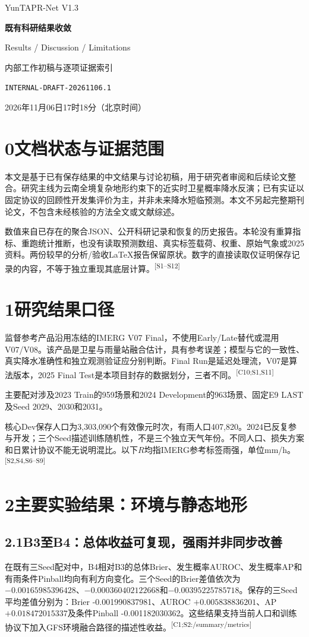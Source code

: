 \documentclass[UTF8,10.5pt,a4paper,fontset=none]{ctexart}
\newcommand{\evi}[1]{\textsuperscript{\textcolor{muted}{[#1]}}}
\newcommand{\nextpart}[1]{\clearpage\section*{#1}}
\begin{document}
\thispagestyle{empty}
\begin{center}
{\Large YunTAPR-Net V1.3}\par\vspace{5mm}
{\LARGE\bfseries 既有科研结果收敛}\par\vspace{3mm}
{\Large Results / Discussion / Limitations}\par\vspace{3mm}
{\large 内部工作初稿与逐项证据索引}\par\vspace{4mm}
\texttt{INTERNAL-DRAFT-20261106.1}\par
2026年11月06日17时18分（北京时间）
\end{center}
\section*{0\quad 文档状态与证据范围}
本文是基于已有保存结果的中文结果与讨论初稿，用于研究者审阅和后续论文整合。研究主线为云南全境复杂地形约束下的近实时卫星概率降水反演；已有实证以固定协议的回顾性开发集评价为主，并非未来降水短临预测。本文不另起完整期刊论文，不包含未经核验的方法全文或文献综述。

数值来自已存在的聚合JSON、公开科研记录和恢复的历史报告。本轮没有重算指标、重跑统计推断，也没有读取预测数组、真实标签载荷、权重、原始气象或2025资料。两份较早的分析/验收LaTeX报告保留原状。数字的直接读取仅证明保存记录的内容，不等于独立重现其底层计算。\evi{S1--S12}

\section*{1\quad 研究结果口径}
监督参考产品沿用冻结的IMERG V07 Final，不使用Early/Late替代或混用V07/V08。该产品是卫星与雨量站融合估计，具有参考误差；模型与它的一致性、真实降水准确性和独立观测验证应分别判断。Final Run是延迟处理流，V07是算法版本，2025 Final Test是本项目封存的数据划分，三者不同。\evi{C10;S1,S11}

主要配对涉及2023 Train的959场景和2024 Development的963场景、固定E9 LAST及Seed 2029、2030和2031。

核心Dev保存人口为3,303,090个有效像元时次，有雨人口407,820。2024已反复参与开发；三个Seed描述训练随机性，不是三个独立天气年份。不同人口、损失方案和日累计协议不能无说明混比。以下$R$均指IMERG参考标签雨强，单位mm/h。\evi{S2,S4,S6--S9}

\nextpart{2\quad 主要实验结果：环境与静态地形}
\subsection*{2.1\quad B3至B4：总体收益可复现，强雨并非同步改善}
在既有三Seed配对中，B4相对B3的总体Brier、发生概率AUROC、发生概率AP和有雨条件Pinball均向有利方向变化。三个Seed的Brier差值依次为$-0.00165985396428$、$-0.000360402122668$和$-0.00395225785718$。保存的三Seed平均差值分别为：Brier -0.001990837981、AUROC $+0.005838836201$、AP $+0.018472015337$及条件Pinball -0.001182030362。这些结果支持当前人口和训练协议下加入GFS环境融合路径的描述性收益。\evi{C1;S2:/summary/metrics}
\end{document}
